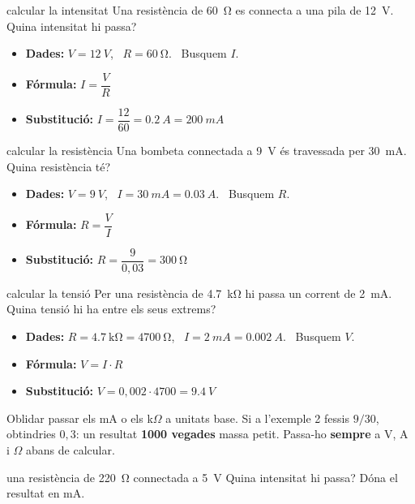 \begin{exemple}{calcular la intensitat}
Una resistència de \SI{60}{\ohm} es connecta a una pila de \SI{12}{V}. Quina intensitat hi passa?
\begin{itemize}
 \item \textbf{Dades:} $V = \SI{12}{V}$, \ $R = \SI{60}{\ohm}$. \ Busquem $I$.
 \item \textbf{Fórmula:} $I = \dfrac{V}{R}$
 \item \textbf{Substitució:} $I = \dfrac{12}{60} = \SI{0,2}{A} = \SI{200}{mA}$
\end{itemize}
\end{exemple}

\begin{exemple}{calcular la resistència}
Una bombeta connectada a \SI{9}{V} és travessada per \SI{30}{mA}. Quina resistència té?
\begin{itemize}
 \item \textbf{Dades:} $V = \SI{9}{V}$, \ $I = \SI{30}{mA} = \SI{0,03}{A}$. \ Busquem $R$.
 \item \textbf{Fórmula:} $R = \dfrac{V}{I}$
 \item \textbf{Substitució:} $R = \dfrac{9}{0{,}03} = \SI{300}{\ohm}$
\end{itemize}
\end{exemple}

\begin{exemple}{calcular la tensió}
Per una resistència de \SI{4,7}{\kilo\ohm} hi passa un corrent de \SI{2}{mA}. Quina tensió hi ha entre els seus extrems?
\begin{itemize}
 \item \textbf{Dades:} $R = \SI{4,7}{\kilo\ohm} = \SI{4700}{\ohm}$, \ $I = \SI{2}{mA} = \SI{0,002}{A}$. \ Busquem $V$.
 \item \textbf{Fórmula:} $V = I \cdot R$
 \item \textbf{Substitució:} $V = 0{,}002 \cdot 4700 = \SI{9,4}{V}$
\end{itemize}
\end{exemple}

\begin{atencio}
Oblidar passar els mA o els k$\Omega$ a unitats base. Si a l'exemple 2 fessis $9 / 30$, obtindries $0{,}3$: un resultat \textbf{1000 vegades} massa petit. Passa-ho \textbf{sempre} a V, A i $\Omega$ abans de calcular.
\end{atencio}

\begin{guiada}{una resistència de \SI{220}{\ohm} connectada a \SI{5}{V}}
Quina intensitat hi passa? Dóna el resultat en mA.
\end{guiada}

